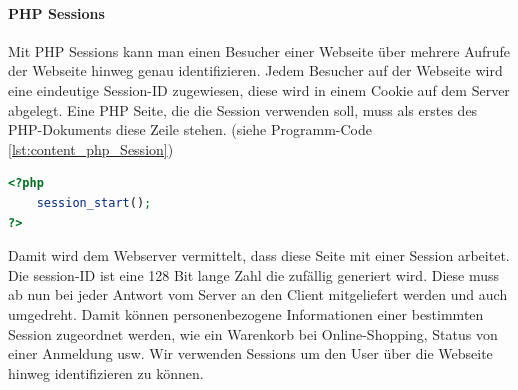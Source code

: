 \paragraph{PHP Sessions}
Mit PHP Sessions kann man einen Besucher einer Webseite über mehrere Aufrufe der Webseite hinweg genau identifizieren. Jedem Besucher auf der Webseite wird eine eindeutige Session-ID zugewiesen, diese wird in einem Cookie auf dem Server abgelegt. Eine PHP Seite, die die Session verwenden soll, muss als erstes des PHP-Dokuments diese Zeile stehen. (siehe Programm-Code \ref{lst:content_php_Session})
\begin{lstlisting}[style=custom, language=PHP, caption={Session},label={lst:content_php_Session}]
<?php
	session_start();
?>
\end{lstlisting}

Damit wird dem Webserver vermittelt, dass diese Seite mit einer Session arbeitet.\\
Die session-ID ist eine 128 Bit lange Zahl die zufällig generiert wird. Diese muss ab nun bei jeder Antwort vom Server an den Client mitgeliefert werden und auch umgedreht. Damit können personenbezogene Informationen einer bestimmten Session zugeordnet werden, wie ein Warenkorb bei Online-Shopping, Status von einer Anmeldung usw. Wir verwenden Sessions um den User über die Webseite hinweg identifizieren zu können. 
